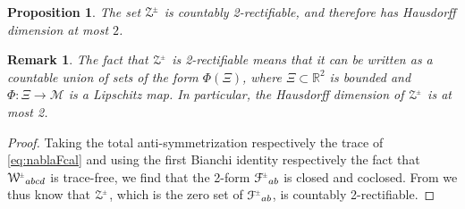 \documentclass[a4paper,11pt,reqno]{amsart}
\newcommand{\Reals}{\mathbb{R}}
\newcommand{\cZ}{\mathcal{Z}}
\newcommand{\cM}{\mathcal{M}}
\newcommand{\cF}{\mathcal{F}}
\theoremstyle{plain}
\newtheorem{prop}[thm]{Proposition}
\newtheorem{remark}[thm]{Remark}
\newcommand{\PM}[1]{{{#1}^{\hspace{-.5pt}\scaleto{\pm}{3.5pt}}}}
\def\Wcal{\mathcal{W}}
\numberwithin{equation}{section}
\begin{document}
\begin{prop} \label{prop:baer}
The set $\PM{\cZ}$ is countably 2-rectifiable, and therefore has Hausdorff dimension at most $2$.
\end{prop}
\begin{remark} 
The fact that $\PM{\cZ}$ is 2-rectifiable means that it can be written as a countable union of sets of the form $\Phi(\Xi)$, where $\Xi \subset \Reals^2$ is bounded and $\Phi: \Xi \to \cM$ is a Lipschitz map. In particular, the Hausdorff dimension of $\PM{\cZ}$ is at most 2.  
%
\end{remark} 

\begin{proof}
Taking the total anti-symmetrization respectively the trace of 
\eqref{eq:nablaFcal} and using the first Bianchi identity respectively the fact that $\PM\Wcal_{abcd}$ is trace-free, we find that the 2-form $\PM\cF_{ab}$ is closed and coclosed. From \cite[Main~Theorem]{Bar-nodal-sets} we thus know that $\PM\cZ$, which is the zero set of $\PM\cF_{ab}$, is countably 2-rectifiable. 
\end{proof}
\end{document}
